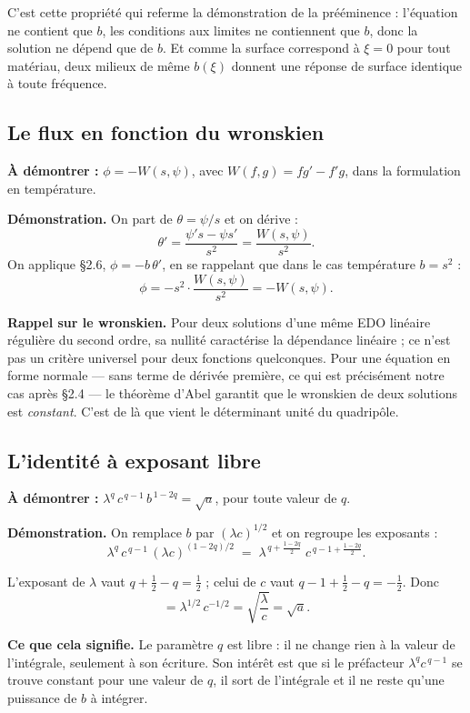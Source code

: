 \documentclass[11pt,a4paper]{article}
\begin{document}
C'est cette propriété qui referme la démonstration de la prééminence : l'équation ne contient que $b$,
les conditions aux limites ne contiennent que $b$, donc la solution ne dépend que de $b$. Et comme la
surface correspond à $\xi = 0$ pour tout matériau, deux milieux de même $b(\xi)$ donnent une réponse de
surface identique à toute fréquence.

\subsection{Le flux en fonction du wronskien}

\textbf{À démontrer :} $\phi = -W(s,\psi)$, avec $W(f,g) = f g' - f' g$, dans la formulation en
température.

\textbf{Démonstration.} On part de $\theta = \psi/s$ et on dérive :
\[ \theta' = \frac{\psi' s - \psi s'}{s^{2}} = \frac{W(s,\psi)}{s^{2}} . \]
On applique §2.6, $\phi = -b\,\theta'$, en se rappelant que dans le cas température $b = s^{2}$ :
\[ \phi = -s^{2}\cdot\frac{W(s,\psi)}{s^{2}} = -W(s,\psi) . \]

\textbf{Rappel sur le wronskien.} Pour deux solutions d'une même EDO linéaire régulière du second ordre, sa nullité caractérise la dépendance linéaire ; ce n'est pas un critère universel pour deux fonctions quelconques. Pour une équation en forme normale --- sans terme de dérivée première, ce qui est
précisément notre cas après §2.4 --- le théorème d'Abel garantit que le wronskien de deux solutions est
\emph{constant}. C'est de là que vient le déterminant unité du quadripôle.

\subsection{L'identité à exposant libre}

\textbf{À démontrer :} $\lambda^{q}\,c^{\,q-1}\,b^{\,1-2q} = \sqrt{a}$, pour toute valeur de $q$.

\textbf{Démonstration.} On remplace $b$ par $(\lambda c)^{1/2}$ et on regroupe les exposants :
\[ \lambda^{q}\,c^{\,q-1}\,(\lambda c)^{(1-2q)/2}
\;=\; \lambda^{\,q + \frac{1-2q}{2}}\; c^{\,q-1+\frac{1-2q}{2}} . \]

L'exposant de $\lambda$ vaut $q + \tfrac{1}{2} - q = \tfrac{1}{2}$ ; celui de $c$ vaut
$q - 1 + \tfrac{1}{2} - q = -\tfrac{1}{2}$. Donc
\[ = \lambda^{1/2}\,c^{-1/2} = \sqrt{\frac{\lambda}{c}} = \sqrt{a} . \]

\textbf{Ce que cela signifie.} Le paramètre $q$ est libre : il ne change rien à la valeur de
l'intégrale, seulement à son écriture. Son intérêt est que si le préfacteur $\lambda^{q}c^{\,q-1}$ se
trouve constant pour une valeur de $q$, il sort de l'intégrale et il ne reste qu'une puissance de $b$
à intégrer.
\end{document}
